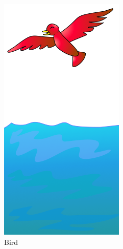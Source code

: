 \begin{figure}
\begin{subfigure}[b]{0.3\textwidth}
        \includegraphics[width=.7\textwidth]{ic_bird3.png}
        \caption{Bird}
      \end{subfigure}
      \begin{subfigure}[b]{0.3\textwidth}

\end{subfigure}
\end{figure}
